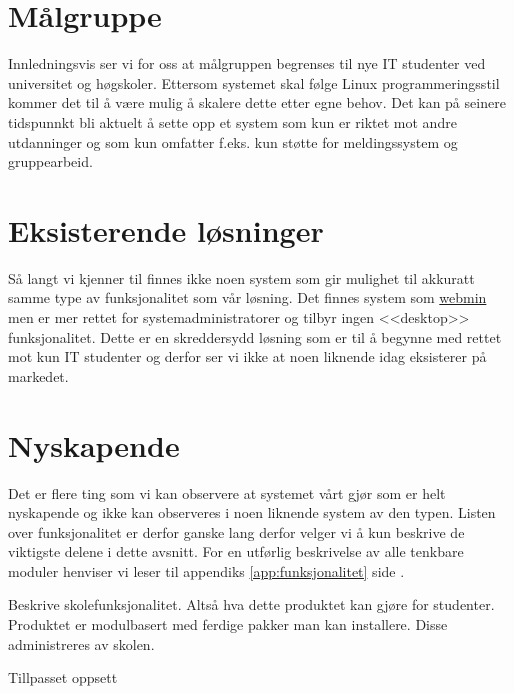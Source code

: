 \section{Målgruppe} \label{sec:målgruppe}
Innledningsvis ser vi for oss at målgruppen begrenses til nye IT studenter ved universitet og høgskoler. Ettersom systemet skal følge Linux programmeringsstil\cite{book:unixprog} kommer det til å være mulig å skalere dette etter egne behov. Det kan på seinere tidspunnkt bli aktuelt å sette opp et system som kun er riktet mot andre utdanninger og som kun omfatter f.eks. kun støtte for meldingssystem og gruppearbeid.

\section{Eksisterende løsninger}
Så langt vi kjenner til finnes ikke noen system som gir mulighet til akkuratt samme type av funksjonalitet som vår løsning. Det finnes system som \href{http://en.wikipedia.org/wiki/Webmin}{webmin} men er mer rettet for systemadministratorer og tilbyr ingen <<desktop>> funksjonalitet. Dette er en skreddersydd løsning som er til å begynne med rettet mot kun IT studenter og derfor ser vi ikke at noen liknende idag eksisterer på markedet. 

\section{Nyskapende}
Det er flere ting som vi kan observere at systemet vårt gjør som er helt nyskapende og ikke kan observeres i noen liknende system av den typen. Listen over funksjonalitet er derfor ganske lang derfor velger vi å kun beskrive de viktigste delene i dette avsnitt. For en utførlig beskrivelse av alle tenkbare moduler henviser vi leser til appendiks \ref{app:funksjonalitet} side \pageref{app:funksjonalitet}.

Beskrive skolefunksjonalitet. Altså hva dette produktet kan gjøre for studenter.\\
Produktet er modulbasert med ferdige pakker man kan installere. Disse administreres av skolen.\\
\begin{description}
\item[Tillpasset oppsett]
\end{description}